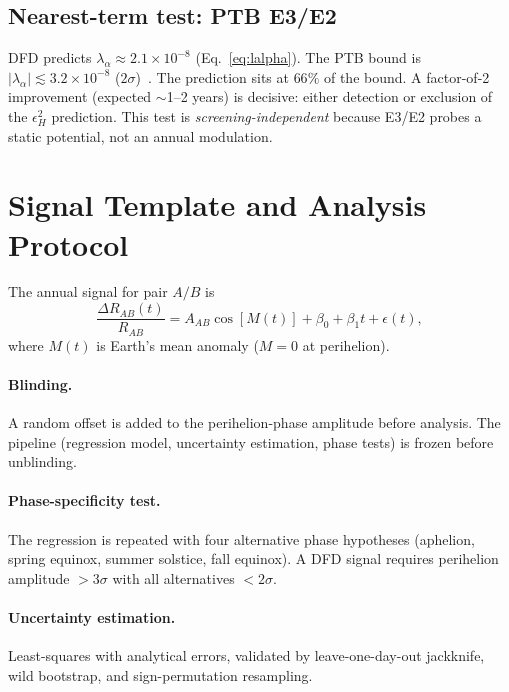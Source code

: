 \documentclass[aps,prd,twocolumn,superscriptaddress,floatfix]{revtex4-2}
\newcommand{\epsH}{\epsilon_H}
\begin{document}
\subsection{Nearest-term test: PTB E3/E2}
DFD predicts $\lambda_\alpha \approx 2.1 \times 10^{-8}$
(Eq.~\ref{eq:lalpha}). The PTB bound is $|\lambda_\alpha|
\lesssim 3.2 \times 10^{-8}$ ($2\sigma$)~\cite{Filzinger2023}.
The prediction sits at $66\%$ of the bound. A factor-of-2
improvement (expected $\sim$1--2 years) is decisive: either
detection or exclusion of the $\epsH^2$ prediction. This test
is \textit{screening-independent} because E3/E2 probes a static
potential, not an annual modulation.
\section{Signal Template and Analysis Protocol}
The annual signal for pair $A/B$ is
\begin{equation}
\frac{\Delta R_{AB}(t)}{R_{AB}}
= A_{AB}\cos[M(t)] + \beta_0 + \beta_1 t + \epsilon(t),
\end{equation}
where $M(t)$ is Earth's mean anomaly ($M = 0$ at perihelion).
\paragraph{Blinding.} A random offset is added to the
perihelion-phase amplitude before analysis. The pipeline
(regression model, uncertainty estimation, phase tests) is
frozen before unblinding.
\paragraph{Phase-specificity test.} The regression is repeated
with four alternative phase hypotheses (aphelion, spring
equinox, summer solstice, fall equinox). A DFD signal requires
perihelion amplitude $> 3\sigma$ with all alternatives $< 2\sigma$.
\paragraph{Uncertainty estimation.} Least-squares with analytical
errors, validated by leave-one-day-out jackknife, wild bootstrap,
and sign-permutation resampling.
\end{document}
